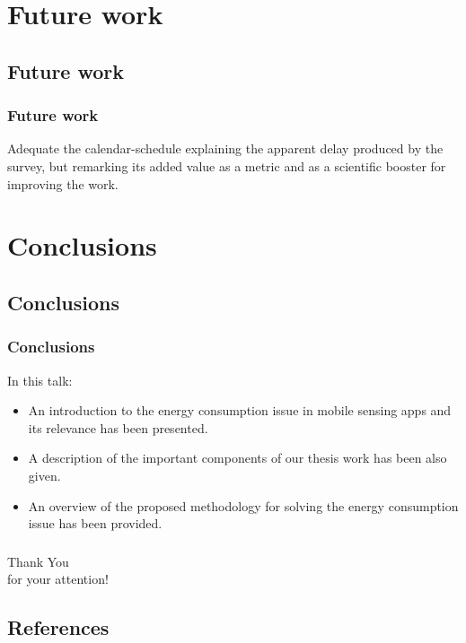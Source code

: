\documentclass[compress,9pt,xcolor={dvipsnames,table}]{beamer}
\begin{document}
\section{Future work}
\subsection{Future work}
\begin{frame}[t]\frametitle{Future work}
    
Adequate the calendar-schedule explaining the apparent delay produced by the survey, but remarking its added value as a metric and as a scientific booster for improving the work.
\end{frame}


\section{Conclusions}
\subsection{Conclusions}
\begin{frame}\frametitle{Conclusions}
In this talk:
\begin{itemize}
  \item An introduction to the energy consumption issue in mobile sensing apps and its relevance has been presented.
  \item A description of the important components of our thesis work has been also given.
  \item An overview of the proposed methodology for solving the energy consumption issue has been provided.
\end{itemize}
\end{frame}

\begin{frame}\frametitle{}
\begin{center}
{
\Huge
Thank You\\ for your attention!
}
\end{center}

\end{frame}

\subsection{References}

% 

\end{document}
